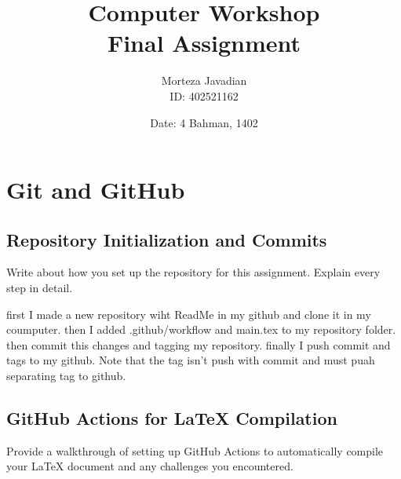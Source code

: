 \documentclass[titlepage]{article}
\title{\huge Computer Workshop\\Final Assignment}
\author{Morteza Javadian\\ID: 402521162}
\date{Date: 4 Bahman, 1402}
\begin{document}
	
	\maketitle
	
	\renewcommand{\contentsname }{ TABLE OF CONTENTS}
	
	\tableofcontents
	\let\LaTeXStandardTableOfContents\tableofcontents
	
	\renewcommand{\tableofcontents}
	{
		\begingroup
		\renewcommand{\bfseries}{\relax}
		\LaTeXStandardTableOfContents
		\endgroup
	}

	\newpage
	
	\section{Git and GitHub}
	\subsection{Repository Initialization and Commits}
	Write about how you set up the repository for this assignment. Explain every step in detail.
	
	first I made a new repository wiht ReadMe in my github and clone it in my coumputer. then I added .github/workflow and main.tex to my repository folder. then commit this changes and tagging my repository. finally I push commit and tags to my github. Note that the tag isn't push with commit and must puah separating tag to github.
	
	\subsection{GitHub Actions for LaTeX Compilation}
	Provide a walkthrough of setting up GitHub Actions to automatically compile your LaTeX document and any challenges you encountered.
	
	

	
	
	
	
	
	
\end{document}
